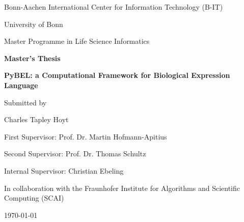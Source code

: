 \begin{titlepage}
    \centering
    Bonn-Aachen International Center for Information Technology (B-IT)

    University of Bonn

    Master Programme in Life Science Informatics

    \vspace{1in}
    {\Large \bfseries Master's Thesis}
    \vspace{1in}

    {\LARGE \bfseries PyBEL: a Computational Framework for Biological Expression Language}
    \vspace{1in}

    {\large Submitted by}

    {\LARGE Charles Tapley Hoyt\par}

    \vspace{1in}

    First Supervisor: Prof. Dr. Martin Hofmann-Apitius
    \par
    Second Supervisor: Prof. Dr. Thomas Schultz
    \par
    Internal Supervisor: Christian Ebeling

    \vfill
    In collaboration with the Fraunhofer Institute for Algorithms and Scientific Computing (SCAI)
    \begin{flushleft}
        \today
    \end{flushleft}

\end{titlepage}





\tableofcontents
\listoffigures
\listoftables
